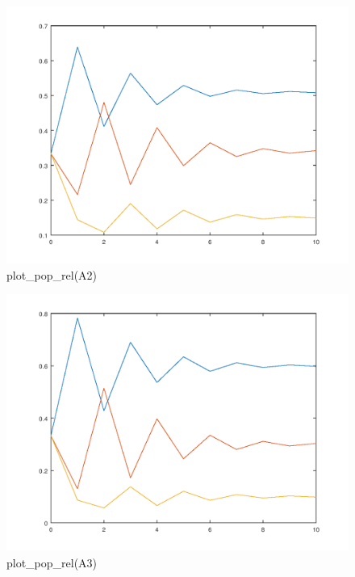 \documentclass{article}
\begin{document}
\begin{figure}[H]
\centering
\includegraphics[scale=0.5]{plotrelA2.png}
\caption{plot\_pop\_rel(A2)}
\label{fig:universe}
\end{figure}

\begin{figure}[H]
\centering
\includegraphics[scale=0.5]{plotrelA3.png}
\caption{plot\_pop\_rel(A3)}
\label{fig:universe}
\end{figure}
\end{document}
